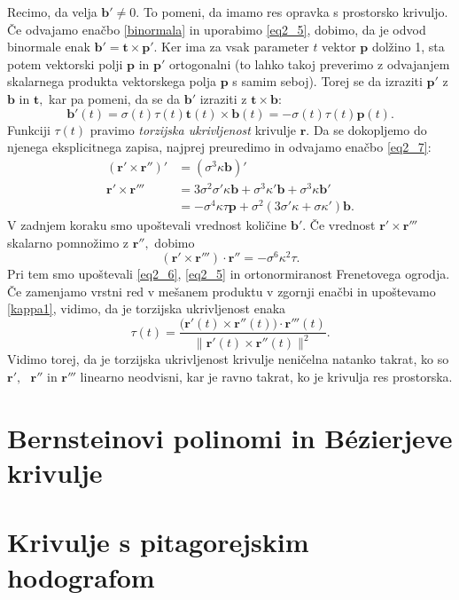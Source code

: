 \documentclass[12pt,a4paper,twoside]{article}
\theoremstyle{definition} %
\theoremstyle{plain} %
\theoremstyle{primerstyle}
\numberwithin{equation}{section}  %
\newcommand{\tV}{\mathbf{t}}
\newcommand{\bV}{\mathbf{b}}
\newcommand{\pV}{\mathbf{p}}
\newcommand{\rV}{\mathbf{r}}
\begin{document}
Recimo, da velja $\bV' \neq 0.$ To pomeni, da imamo res opravka s prostorsko krivuljo. Če odvajamo enačbo \eqref{binormala} in uporabimo \eqref{eq2_5}, dobimo, da je odvod binormale enak $\bV'=\tV \times \pV'.$ Ker ima za vsak parameter $t$ vektor $\pV$ dolžino 1, sta potem vektorski polji $\pV$ in $\pV'$ ortogonalni (to lahko takoj preverimo z odvajanjem skalarnega produkta vektorskega polja $\pV$ s samim seboj). Torej se da izraziti $\pV'$ z $\bV$ in $\tV,$ kar pa pomeni, da se da $\bV'$ izraziti z $\tV \times \bV:$
\begin{equation}
	\label{eq2_11}
	\bV'(t)=\sigma(t)\tau(t)\tV(t)\times \bV(t)=-\sigma(t)\tau(t)\pV(t).
\end{equation}
Funkciji $\tau(t)$ pravimo \textit{torzijska ukrivljenost} krivulje $\rV.$ Da se dokopljemo do njenega eksplicitnega zapisa, najprej preuredimo in odvajamo enačbo \eqref{eq2_7}:
\begin{align*}
	(\rV' \times \rV'')'&=(\sigma^3\kappa \bV)'\\
	\rV' \times \rV''' &= 3\sigma^2\sigma'\kappa\bV+\sigma^3\kappa'\bV+\sigma^3\kappa\bV'\\
	&=-\sigma^4\kappa\tau\pV+\sigma^2(3\sigma'\kappa+\sigma\kappa')\bV.
\end{align*}
V zadnjem koraku smo upoštevali vrednost količine $\bV'.$ Če vrednost $\rV'\times \rV'''$ skalarno pomnožimo z $\rV'',$ dobimo
\begin{equation}
	(\rV'\times\rV''')\cdot\rV''=-\sigma^6\kappa^2\tau.
\end{equation}
Pri tem smo upoštevali \eqref{eq2_6}, \eqref{eq2_5} in ortonormiranost Frenetovega ogrodja. Če zamenjamo vrstni red v mešanem produktu v zgornji enačbi in upoštevamo \eqref{kappa1}, vidimo, da je torzijska ukrivljenost enaka
\begin{equation}
	\label{tau1}
	\tau(t)=\frac{\big(\rV'(t)\times\rV''(t)\big)\cdot\rV'''(t)}{\lVert \rV'(t)\times \rV''(t) \rVert^2}.
\end{equation}
Vidimo torej, da je torzijska ukrivljenost krivulje neničelna natanko takrat, ko so $\rV', \text{ } \rV''$ in $\rV'''$ linearno neodvisni, kar je ravno takrat, ko je krivulja res prostorska.
\section{Bernsteinovi polinomi in Bézierjeve krivulje}
\section{Krivulje s pitagorejskim hodografom}
\end{document}
